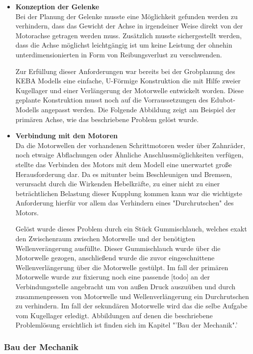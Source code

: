 \begin{itemize}
\item \textbf{Konzeption der Gelenke}\\
Bei der Planung der Gelenke musste eine Möglichkeit gefunden werden zu verhindern, dass das Gewicht der Achse in irgendeiner Weise direkt von der Motorachse getragen werden muss. Zusätzlich musste sichergestellt werden, dass die Achse möglichst leichtgängig ist um keine Leistung der ohnehin unterdimensionierten in Form von Reibungsverlust zu verschwenden.

Zur Erfüllung dieser Anforderungen war bereits bei der Grobplanung des KEBA Modells eine einfache, U-Förmige Konstruktion die mit Hilfe zweier Kugellager und einer Verlängerung der Motorwelle entwickelt worden. Diese geplante Konstruktion musst noch auf die Vorraussetzungen des Edubot-Modells angepasst werden. Die Folgende Abbildung zeigt am Beispiel der primären Achse, wie das beschriebene Problem gelöst wurde.
\item \textbf{Verbindung mit den Motoren}\\
Da die Motorwellen der vorhandenen Schrittmotoren weder über Zahnräder, noch etwaige Abflachungen oder Ähnliche Anschlussmöglichkeiten verfügen, stellte das Verbinden des Motors mit dem Modell eine unerwartet große Herausforderung dar. Da es mitunter beim Beschleunigen und Bremsen, verursacht durch die Wirkenden Hebelkräfte, zu einer nicht zu einer beträchtlichen Belastung dieser Kupplung kommen kann war die wichtigste Anforderung hierfür vor allem das Verhindern eines "Durchrutschen" des Motors. 

Gelöst wurde dieses Problem durch ein Stück Gummischlauch, welches exakt den Zwischenraum zwischen Motorwelle und der benötigten Wellenverängerung ausfüllte. Dieser Gummischlauch wurde über die Motorwelle gezogen, anschließend wurde die zuvor eingeschnittene Wellenverlängerung über die Motorwelle gestülpt. Im fall der primären Motorwelle wurde zur fixierung noch eine passende [todo] an der Verbindungsstelle angebracht um von außen Druck auszuüben und durch zusammenpressen von Motorwelle und Wellenverlängerung ein Durchrutschen zu verhindern. Im fall der sekundären Motorwelle wird das die selbe Aufgabe vom Kugellager erledigt. Abbildungen auf denen die beschriebene Problemlösung ersichtlich ist finden sich im Kapitel "'Bau der Mechanik".'
\end{itemize}
\subsubsection{Bau der Mechanik}
